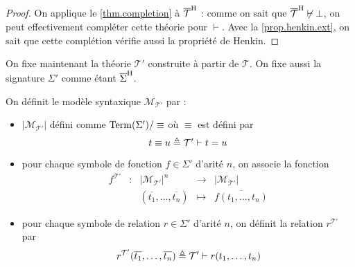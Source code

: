 \begin{proof}
  On applique le \cref{thm.completion} à $\overline{\mathcal T}^{\mathrm H}$ : comme on sait
  que $\overline{\mathcal T}^{\mathrm H}\not\vdash\bot$, on peut effectivement compléter cette
  théorie pour $\vdash$. Avec la \cref{prop.henkin.ext}, on sait que cette
  complétion vérifie aussi la propriété de Henkin.
\end{proof}

On fixe maintenant la théorie $\mathcal T'$ construite à partir de $\mathcal T$.
On fixe aussi la signature $\Sigma'$ comme étant $\overline{\Sigma}^{\mathrm H}$.

\begin{definition}
  On définit le modèle syntaxique $\mathcal M_{\mathcal T'}$ par :
  \begin{itemize}
  \item $|\mathcal M_{\mathcal T'}|$ défini comme $\operatorname{Term}(\Sigma')/\equiv$ où
    $\equiv$ est défini par
    \[t\equiv u \triangleq \mathcal T'\vdash t = u\]
  \item pour chaque symbole de fonction $f\in\Sigma'$ d'arité $n$, on associe la
    fonction
    \[\begin{array}{ccccc}
    f^{\mathcal T'} & : & |\mathcal M_{\mathcal T'}|^n & \longrightarrow &
    |\mathcal M_{\mathcal T'}|\\
    & & (\overline{t_1},\ldots,\overline{t_n}) & \longmapsto &
    \overline{f(t_1,\ldots,t_n)}
    \end{array}\]
  \item pour chaque symbole de relation $r\in\Sigma'$ d'arité $n$, on définit la
    relation $r^{\mathcal T'}$ par
    \[r^{\mathcal T'}(\overline{t_1},\ldots,\overline{t_n}) \triangleq
    \mathcal T'\vdash r(t_1,\ldots,t_n)\]
  \end{itemize}
\end{definition}


